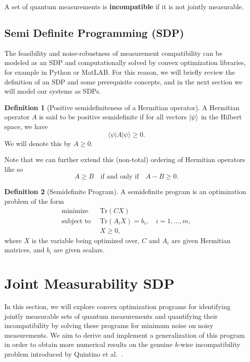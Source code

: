 \documentclass[oneside, a4paper, onecolumn, 11pt]{article}
\theoremstyle{definition}
\newtheorem{definition}{Definition}[section]
\theoremstyle{plain}
\theoremstyle{remark}
\begin{document}
A set of quantum measurements is \textbf{incompatible} if it is not jointly measurable.

\subsection{Semi Definite Programming (SDP)}
The feasibility and noise-robustness of measurement compatibility can be modeled as an SDP and computationally solved by convex optimization libraries, for example in Python or MatLAB.
For this reason, we will briefly review the definition of an SDP and some prerequisite concepts, and in the next section we will model our systems as SDPs.

\begin{definition}[Positive semidefiniteness of a Hermitian operator]
  A Hermitian operator $A$ is said to be positive semidefinite if for all vectors $\ket{\psi}$ in the Hilbert space, we have
  \begin{equation}
    \langle \psi | A | \psi \rangle \geq 0.
  \end{equation}
  We will denote this by $A \geq 0$.
\end{definition}

Note that we can further extend this (non-total) ordering of Hermitian operators like so
\begin{equation}
  A \geq B \quad \text{if and only if} \quad A - B \geq 0.
\end{equation}

\begin{definition}[Semidefinite Program]
  A semidefinite program is an optimization problem of the form
  \begin{equation}
    \begin{aligned}
      \text{minimize} \;\;& \text{Tr}(C X) \\[2pt]
      \text{subject to} \;\;& \text{Tr}(A_i X) = b_i, \quad i = 1, \ldots, m, \\[2pt]
                          & X \geq 0,
    \end{aligned}
  \end{equation}
  where $X$ is the variable being optimized over, $C$ and $A_i$ are given Hermitian matrices, and $b_i$ are given scalars.
  
\end{definition}

\newpage
\section{Joint Measurability SDP}\label{sec:sdp}
In this section, we will explore convex optimization programs for identifying jointly measurable sets of quantum measurements and quantifying their incompatibility by solving these programs for minimum noise on noisy measurements.
We aim to derive and implement a generalization of this program in order to obtain more numerical results on the genuine $k$-wise incompatibility problem introduced by Quintino et al.~\cite{Quintino2019}.
\end{document}

